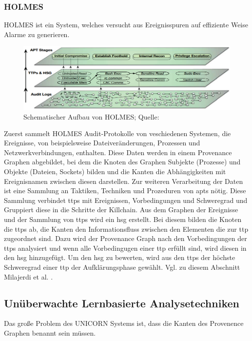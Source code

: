 \documentclass[conference]{IEEEtran}
\begin{document}
\subsubsection{HOLMES}
HOLMES ist ein System, welches versucht aus Ereignisspuren auf effiziente Weise Alarme zu generieren.
\begin{figure}
    \centerline{\includegraphics[scale=0.27]{figures/HOLMES.png}}
    \caption{Schematischer Aufbau von HOLMES; Quelle: \cite{Milajerdi2019}}
    \label{fig.holmes}
\end{figure}
Zuerst sammelt HOLMES Audit-Protokolle von veschiedenen Systemen, die Ereignisse, von beispielsweise Dateiveränderungen, Prozessen und Netzwerkverbindungen, enthalten.
Diese Daten werden in einem Provenance Graphen abgebildet, bei dem die Knoten des Graphen Subjekte (Prozesse) und Objekte (Dateien, Sockets) bilden und die Kanten die Abhängigkeiten mit Ereignisnamen zwischen diesen darstellen.
Zur weiteren Verarbeitung der Daten ist eine Sammlung an Taktiken, Techniken und Prozeduren von \acp{apt} nötig.
Diese Sammlung verbindet \acp{ttp} mit Ereignissen, Vorbedingungen und Schweregrad und Gruppiert diese in die Schritte der Killchain.
Aus dem Graphen der Ereignisse und der Sammlung von \acp{ttp} wird ein \ac{hsg} erstellt.
Bei diesem bilden die Knoten die \acp{ttp} ab, die Kanten den Informationsfluss zwischen den Elementen die zur \ac{ttp} zugeordnet sind.
Dazu wird der Provenance Graph nach den Vorbedingungen der \acp{ttp} analysiert und wenn alle Vorbedingugen einer \ac{ttp} erfüllt sind, wird diesen in den \ac{hsg} hinzugefügt.
Um den  \ac{hsg} zu bewerten, wird aus den \acp{ttp} der höchste Schweregrad einer \ac{ttp} der Aufklärungsphase gewählt.
Vgl. zu diesem Abschnitt Milajerdi et al. \cite{Milajerdi2019}.
\subsection{Unüberwachte Lernbasierte Analysetechniken}
Das große Problem des UNICORN Systems ist, dass die Kanten des Provenence Graphen benannt sein müssen.
\end{document}
